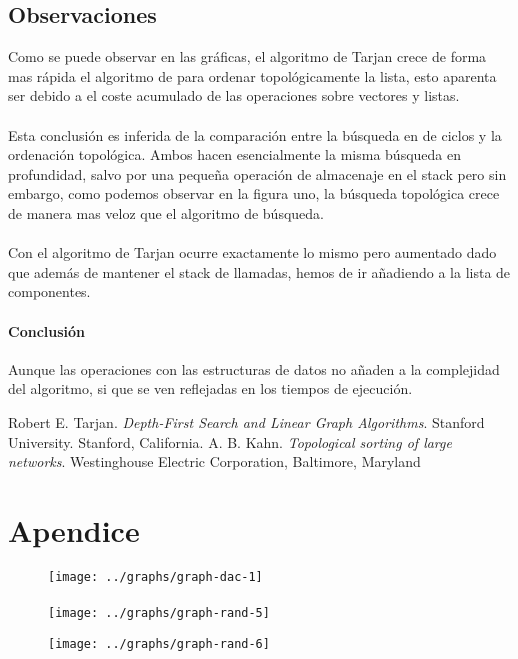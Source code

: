 \documentclass{article}
\begin{document}
\subsection{Observaciones}
Como se puede observar en las gráficas, el algoritmo de Tarjan\cite{tarjan} crece de forma mas rápida
el algoritmo de para ordenar topológicamente la lista, esto aparenta ser debido a el coste acumulado de las operaciones sobre vectores y listas.
\paragraph{}Esta conclusión es inferida de la comparación entre la búsqueda en de ciclos y la ordenación topológica. Ambos hacen esencialmente la misma búsqueda en profundidad, salvo por una pequeña operación de almacenaje en el stack
pero sin embargo, como podemos observar en la figura uno, la búsqueda topológica crece de manera mas veloz que el algoritmo de búsqueda.
\paragraph{}Con el algoritmo de Tarjan\cite{tarjan} ocurre exactamente lo mismo pero aumentado dado que además de mantener el stack de llamadas, hemos de ir añadiendo a la lista de componentes.
\paragraph{Conclusión} Aunque las operaciones con las estructuras de datos no añaden a la complejidad del algoritmo, si que se ven reflejadas en los tiempos de ejecución.
\begin{thebibliography}{9}
 Robert E. Tarjan. \textit{Depth-First Search and Linear Graph Algorithms}.
Stanford University. Stanford, California.
 A. B. Kahn. \textit{Topological sorting of large networks}. Westinghouse Electric Corporation, Baltimore, Maryland
\end{thebibliography}
\section{Apendice}
\appendix
\begin{figure}[h!]
	\centering
	  	\texttt{[image: ../graphs/graph-dac-1]}
	\label{fig-dac-1}
\end{figure}
\paragraph{} 
\begin{figure}[h!]
	\centering
		  \texttt{[image: ../graphs/graph-rand-5]}
	\label{fig-rand-5}
\end{figure}
\begin{figure}[h!]
	\centering
	  	\texttt{[image: ../graphs/graph-rand-6]}
	\label{fig-rand-6}
\end{figure}
\end{document}
